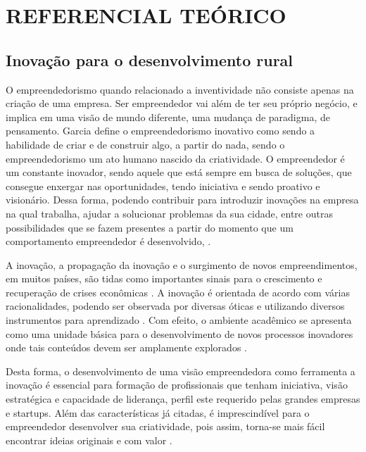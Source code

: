 \chapter{REFERENCIAL TEÓRICO}

\section{Inovação para o desenvolvimento rural}


O empreendedorismo quando relacionado a inventividade não consiste apenas na criação de uma empresa. Ser empreendedor vai além de ter seu próprio negócio, e implica em uma visão de mundo diferente, uma mudança de paradigma, de pensamento. Garcia \cite{garcia_formacao_2000} define o empreendedorismo inovativo como sendo a habilidade de criar e de construir algo, a partir do nada, sendo o empreendedorismo um ato humano nascido da criatividade. O empreendedor é um constante inovador, sendo aquele que está sempre em busca de soluções, que consegue enxergar nas oportunidades, tendo iniciativa e sendo proativo e visionário. Dessa forma, podendo contribuir para introduzir inovações na empresa na qual trabalha, ajudar a solucionar problemas da sua cidade, entre outras possibilidades que se fazem presentes a partir do momento que um comportamento empreendedor é desenvolvido, \cite{alencar_intencao_2019, loiola_cao_2016}.

A inovação, a propagação da inovação e o surgimento de novos empreendimentos, em muitos países, são tidas como importantes sinais para o crescimento e recuperação de crises econômicas \cite{silva_educacao_2017}. A inovação é orientada de acordo com várias racionalidades, podendo ser observada por diversas óticas e utilizando diversos instrumentos para aprendizado \cite{munoz_innovacion_2016}. Com efeito, o ambiente acadêmico se apresenta como uma unidade básica para o desenvolvimento de novos processos inovadores onde tais conteúdos devem ser amplamente explorados \cite{costa_inovacao_2017}. 

Desta forma, o desenvolvimento de uma visão empreendedora como ferramenta a inovação é essencial para formação de profissionais que tenham iniciativa, visão estratégica e capacidade de liderança, perfil este requerido pelas grandes empresas e startups. Além das características já citadas, é imprescindível para o empreendedor desenvolver sua criatividade, pois assim, torna-se mais fácil encontrar ideias originais e com valor \cite{macedo_capital_2019}. 

